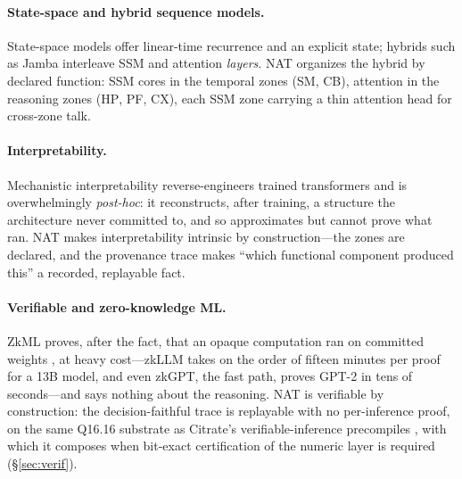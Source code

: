 \documentclass[11pt]{article}
\newcommand{\zone}[1]{\textsc{#1}}
\newcommand{\Qff}{Q16.16}
\begin{document}
\paragraph{State-space and hybrid sequence models.}
State-space models \citep{gu2021s4,gu2023mamba,dao2024mamba2} offer linear-time recurrence and an
explicit state; hybrids such as Jamba \citep{lieber2024jamba} interleave SSM and attention
\emph{layers}. NAT organizes the hybrid by declared function: SSM cores in the temporal zones (\zone{SM},
\zone{CB}), attention in the reasoning zones (\zone{HP}, \zone{PF}, \zone{CX}), each SSM zone carrying a
thin attention head for cross-zone talk.

\paragraph{Interpretability.}
Mechanistic interpretability reverse-engineers trained transformers
\citep{rai2024practical,bereska2024mechanistic} and is overwhelmingly \emph{post-hoc}: it
reconstructs, after training, a structure the architecture never committed to, and so approximates
but cannot prove what ran. NAT makes interpretability intrinsic by construction---the zones are
declared, and the provenance trace makes ``which functional component produced this'' a recorded,
replayable fact.

\paragraph{Verifiable and zero-knowledge ML.}
ZkML proves, after the fact, that an opaque computation ran on committed weights
\citep{chen2024zkml,sun2024zkllm,qu2025zkgpt,peng2025survey}, at heavy cost---zkLLM takes on the order
of fifteen minutes per proof for a 13B model, and even zkGPT, the fast path, proves GPT-2 in tens of
seconds---and says nothing about the reasoning. NAT is verifiable by construction: the
decision-faithful trace is replayable with no per-inference proof, on the same \Qff{} substrate as
Citrate's verifiable-inference precompiles \citep{citrate10}, with which it composes when bit-exact
certification of the numeric layer is required (\S\ref{sec:verif}).
\end{document}
